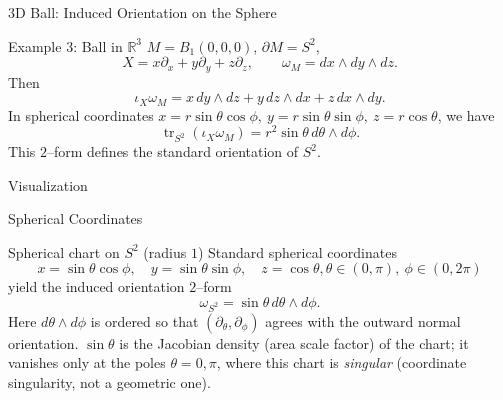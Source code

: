 \begin{frame}{3D Ball: Induced Orientation on the Sphere}
\begin{block}{Example 3: Ball in \(\mathbb{R}^3\)}
\(M=B_1(0,0,0)\), \(\partial M=S^2\),
\[
X=x\partial_x+y\partial_y+z\partial_z,\qquad
\omega_M=dx\wedge dy\wedge dz.
\]
Then
\[
\iota_X\omega_M
= x\,dy\wedge dz + y\,dz\wedge dx + z\,dx\wedge dy.
\]
In spherical coordinates \(x=r\sin\theta\cos\phi,\ y=r\sin\theta\sin\phi,\ z=r\cos\theta\),
we have
\[
\operatorname{tr}_{S^2}(\iota_X\omega_M)
= r^2\sin\theta\,d\theta\wedge d\phi.
\]
This $2$–form defines the standard orientation of $S^2$.
\end{block}
\end{frame}

\begin{frame}{Visualization}
\begin{center}
\end{center}
\end{frame}


\begin{frame}{Spherical Coordinates}
\begin{block}{Spherical chart on \(S^2\) (radius \(1\))}
Standard spherical coordinates
\vspace{-0.2cm}
\[
x=\sin\theta\cos\phi,\quad
y=\sin\theta\sin\phi,\quad
z=\cos\theta, \theta\in(0,\pi),\ \phi\in(0,2\pi)
\]
yield the induced orientation $2$–form
\vspace{-0.2cm}
\[
\omega_{S^2}=\sin\theta\,d\theta\wedge d\phi.
\]
Here \(d\theta\wedge d\phi\) is ordered so that \((\partial_\theta,\partial_\phi)\) agrees with the outward normal orientation.
\(\sin\theta\) is the Jacobian density (area scale factor) of the chart; it vanishes only at the poles \(\theta=0,\pi\), where this chart is \emph{singular} (coordinate singularity, not a geometric one).
\end{block}

\end{frame}


